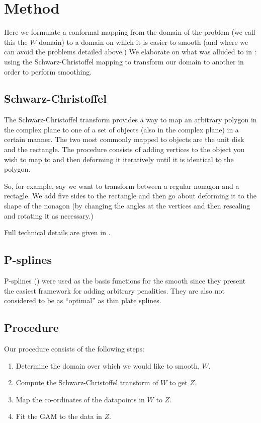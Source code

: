 \documentclass[a4paper,10pt]{amsart}
\newcommand{\sch}{Schwarz-Christoffel }
\begin{document}
\section{Method}

Here we formulate a conformal mapping from the domain of the problem (we call this the $W$ domain) to a domain on which it is easier to smooth (and where we can avoid the problems detailed above.) We elaborate on what was alluded to in \cite{eilerstalk}: using the \sch mapping to transform our domain to another in order to perform smoothing.

\subsection{\sch}

The \sch transform provides a way to map an arbitrary polygon in the complex plane to one of a set of objects (also in the complex plane) in a certain manner. The two most commonly mapped to objects are the unit disk and the rectangle. The procedure consists of adding vertices to the object you wish to map to and then deforming it iteratively until it is identical to the polygon.

So, for example, say we want to transform between a regular nonagon and a rectagle. We add five sides to the rectangle and then go about deforming it to the shape of the nonagon (by changing the angles at the vertices and then rescaling and rotating it as necessary.) 

Full technical details are given in \cite{miller08}.


\subsection{P-splines}
P-splines (\cite{eilersmarx96}) were used as the basis functions for the smooth since they present the easiest framework for adding arbitrary penalities. They are also not considered to be as ``optimal'' as thin plate splines.




\subsection{Procedure}

Our procedure consists of the following steps:

\begin{enumerate}
\item Determine the domain over which we would like to smooth, $W$.

\item Compute the \sch transform of $W$ to get $Z$.

\item Map the co-ordinates of the datapoints in $W$ to $Z$.

\item Fit the GAM to the data in $Z$.

\end{enumerate}
\end{document}
